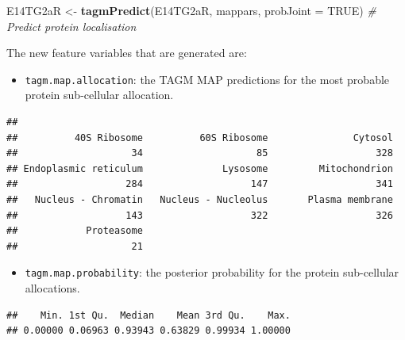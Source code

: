 \documentclass[
]{article}
\newenvironment{Shaded}{\begin{snugshade}}{\end{snugshade}}
\newcommand{\CommentTok}[1]{\textcolor[rgb]{0.56,0.35,0.01}{\textit{#1}}}
\newcommand{\DataTypeTok}[1]{\textcolor[rgb]{0.13,0.29,0.53}{#1}}
\newcommand{\KeywordTok}[1]{\textcolor[rgb]{0.13,0.29,0.53}{\textbf{#1}}}
\newcommand{\NormalTok}[1]{#1}
\newcommand{\OperatorTok}[1]{\textcolor[rgb]{0.81,0.36,0.00}{\textbf{#1}}}
\newcommand{\OtherTok}[1]{\textcolor[rgb]{0.56,0.35,0.01}{#1}}
\newcommand{\StringTok}[1]{\textcolor[rgb]{0.31,0.60,0.02}{#1}}
\providecommand{\tightlist}{%
  \setlength{\itemsep}{0pt}\setlength{\parskip}{0pt}}
\begin{document}
\begin{Shaded}
\begin{Highlighting}[]
\NormalTok{E14TG2aR <-}\StringTok{ }\KeywordTok{tagmPredict}\NormalTok{(E14TG2aR, mappars, }\DataTypeTok{probJoint =} \OtherTok{TRUE}\NormalTok{) }\CommentTok{# Predict protein localisation}
\end{Highlighting}
\end{Shaded}

The new feature variables that are generated are:

\begin{itemize}
\tightlist
\item
  \texttt{tagm.map.allocation}: the TAGM MAP predictions for the most
  probable protein sub-cellular allocation.
\end{itemize}

\begin{Shaded}
\end{Shaded}

\begin{verbatim}
## 
##          40S Ribosome          60S Ribosome               Cytosol 
##                    34                    85                   328 
## Endoplasmic reticulum              Lysosome         Mitochondrion 
##                   284                   147                   341 
##   Nucleus - Chromatin   Nucleus - Nucleolus       Plasma membrane 
##                   143                   322                   326 
##            Proteasome 
##                    21
\end{verbatim}

\begin{itemize}
\tightlist
\item
  \texttt{tagm.map.probability}: the posterior probability for the
  protein sub-cellular allocations.
\end{itemize}

\begin{Shaded}
\end{Shaded}

\begin{verbatim}
##    Min. 1st Qu.  Median    Mean 3rd Qu.    Max. 
## 0.00000 0.06963 0.93943 0.63829 0.99934 1.00000
\end{verbatim}
\end{document}
